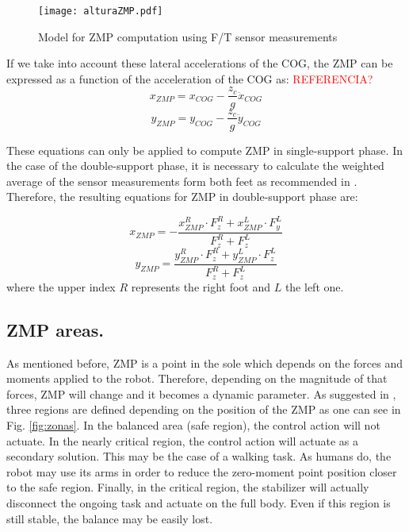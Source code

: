 \begin{figure}[!hbt]
\centering
\texttt{[image: alturaZMP.pdf]}
\caption{Model for ZMP computation using F/T sensor measurements}
\label{fig:altura}
\end{figure}

If we take into account these lateral accelerations of the COG, the ZMP can be expressed as a function of the acceleration of the COG as: \textcolor{red}{REFERENCIA?}
\begin{equation}
x_{ZMP}=x_{COG}-\frac{z_c}{g}\ddot{x}_{COG}
\end{equation}
\begin{equation}
y_{ZMP}=y_{COG}-\frac{z_c}{g}\ddot{y}_{COG}
\end{equation}

These equations can only be applied to compute ZMP in single-support phase. In the case of the double-support phase, it is necessary to calculate the weighted average of the sensor measurements form both feet as recommended in \cite[pp. 82-83]{Kaj2005}. Therefore, the resulting equations for ZMP in double-support phase are:

\begin{equation}
x_{ZMP} = -\frac{x_{ZMP}^{R} \cdot F_{z}^{R} + x_{ZMP}^{L} \cdot F_{y}^{L}}{F_{z}^{R}+F_{z}^{L}}
\end{equation}
\begin{equation}
y_{ZMP} = \frac{y_{ZMP}^{R} \cdot F_{z}^{R} + y_{ZMP}^{L} \cdot F_{z}^{L}}{F_{z}^{R}+F_{z}^{L}}
\end{equation}
where the upper index $R$ represents the right foot and $L$ the left one.

\subsection{ZMP areas.}
As mentioned before, ZMP is a point in the sole which depends on the forces and moments applied to the robot. Therefore, depending on the magnitude of that forces, ZMP will change and it becomes a dynamic parameter. As suggested in \cite{Vuk2007}, three regions are defined depending on the position of the ZMP as one can see in Fig. \ref{fig:zonas}.
In the balanced area (safe region), the control action will not actuate. In the nearly critical region, the control action will actuate as a secondary solution. This may be the case of a walking task. As humans do, the robot may use its arms in order to reduce the zero-moment point position closer to the safe region. Finally, in the critical region, the stabilizer will actually disconnect the ongoing task and actuate on the full body. Even if this region is still stable, the balance may be easily lost. 


